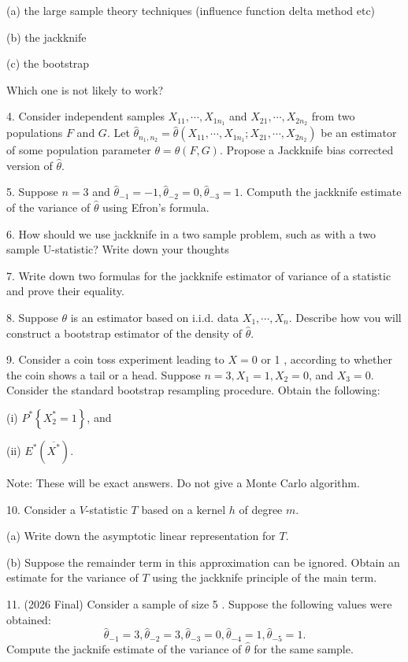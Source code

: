 \documentclass[11pt]{article}
\theoremstyle{definition}
\begin{document}
(a) the large sample theory techniques (influence function delta method etc)

(b) the jackknife

(c) the bootstrap

Which one is not likely to work?

4. Consider independent samples $X_{11}, \cdots, X_{1 n_1}$ and $X_{21}, \cdots, X_{2 n_2}$ from two populations $F$ and $G$. Let $\widehat{\theta}_{n_1, n_2}=\widehat{\theta}\left(X_{11}, \cdots, X_{1 n_1} ; X_{21}, \cdots, X_{2 n_2}\right)$ be an estimator of some population parameter $\theta=\theta(F, G)$. Propose a Jackknife bias corrected version of $\widehat{\theta}$.


5. Suppose $n=3$ and $\widehat{\theta}_{-1}=-1, \widehat{\theta}_{-2}=0, \widehat{\theta}_{-3}=1$. Computh the jackknife estimate of the variance of $\widehat{\theta}$ using Efron's formula.


6. How should we use jackknife in a two sample problem, such as with a two sample U-statistic? Write down your thoughts

7. Write down two formulas for the jackknife estimator of variance of a statistic and prove their equality.

8. Suppose $\theta$ is an estimator based on i.i.d. data $X_1, \cdots, X_n$. Describe how vou will construct a bootstrap estimator of the density of $\widehat{\theta}$.

9. Consider a coin toss experiment leading to $X=0$ or 1 , according to whether the coin shows a tail or a head. Suppose $n=3, X_1=1, X_2=0$, and $X_3=0$. Consider the standard bootstrap resampling procedure. Obtain the following:

(i) $P^*\left\{X_2^*=1\right\}$, and

(ii) $E^*\left(\overline{X^*}\right)$.

Note: These will be exact answers. Do not give a Monte Carlo algorithm.

10. Consider a $V$-statistic $T$ based on a kernel $h$ of degree $m$.

(a) Write down the asymptotic linear representation for $T$.

(b) Suppose the remainder term in this approximation can be ignored. Obtain an estimate for the variance of $T$ using the jackknife principle of the main term.

11. (2026 Final) Consider a sample of size 5 . Suppose the following values were obtained:
$$
\widehat{\theta}_{-1}=3, \widehat{\theta}_{-2}=3, \widehat{\theta}_{-3}=0, \widehat{\theta}_{-4}=1, \widehat{\theta}_{-5}=1 .
$$
Compute the jacknife estimate of the variance of $\widehat{\theta}$ for the same sample.
\end{document}
